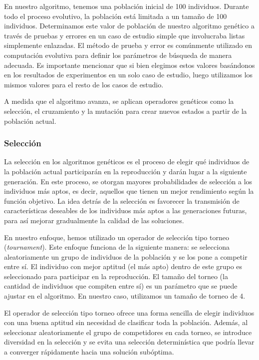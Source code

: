 En nuestro algoritmo, tenemos una población inicial de 100 individuos. Durante todo el proceso evolutivo, la población está limitada a un tamaño de 100 individuos. Determinamos este valor de población de nuestro algoritmo genético a través de pruebas y errores en un caso de estudio simple que involucraba listas simplemente enlazadas. El método de prueba y error es comúnmente utilizado en computación evolutiva para definir los parámetros de búsqueda de manera adecuada. Es importante mencionar que si bien elegimos estos valores basándonos en los resultados de experimentos en un solo caso de estudio, luego utilizamos los mismos valores para el resto de los casos de estudio.

A medida que el algoritmo avanza, se aplican operadores genéticos como la selección, el cruzamiento y la mutación para crear nuevos estados a partir de la población actual.

\subsubsection{Selección}

La selección en los algoritmos genéticos es el proceso de elegir qué individuos de la población actual participarán en la reproducción y darán lugar a la siguiente generación. En este proceso, se otorgan mayores probabilidades de selección a los individuos más aptos, es decir, aquellos que tienen un mejor rendimiento según la función objetivo. La idea detrás de la selección es favorecer la transmisión de características deseables de los individuos más aptos a las generaciones futuras, para así mejorar gradualmente la calidad de las soluciones.

En nuestro enfoque, hemos utilizado un operador de selección tipo torneo (\emph{tournament}). Este enfoque funciona de la siguiente manera: se selecciona aleatoriamente un grupo de individuos de la población y se los pone a competir entre sí. El individuo con mejor aptitud (el más apto) dentro de este grupo es seleccionado para participar en la reproducción. El tamaño del torneo (la cantidad de individuos que compiten entre sí) es un parámetro que se puede ajustar en el algoritmo. En nuestro caso, utilizamos un tamaño de torneo de 4.

El operador de selección tipo torneo ofrece una forma sencilla de elegir individuos con una buena aptitud sin necesidad de clasificar toda la población. Además, al seleccionar aleatoriamente el grupo de competidores en cada torneo, se introduce diversidad en la selección y se evita una selección determinística que podría llevar a converger rápidamente hacia una solución subóptima.


